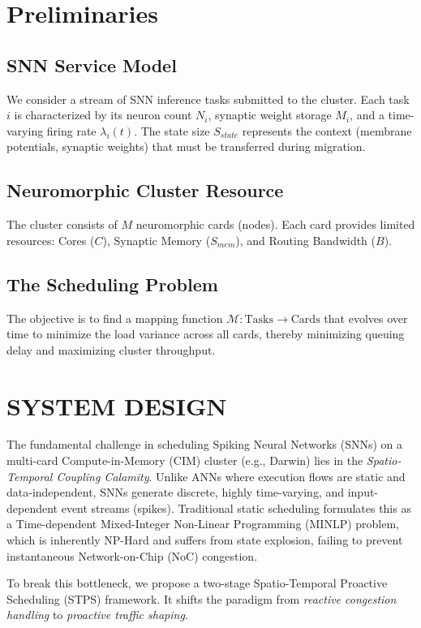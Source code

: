 \documentclass[letterpaper,twocolumn,10pt]{article}
\begin{document}
\section{Preliminaries}
\subsection{SNN Service Model}
We consider a stream of SNN inference tasks submitted to the cluster. Each task $i$ is characterized by its neuron count $N_i$, synaptic weight storage $M_i$, and a time-varying firing rate $\lambda_i(t)$. The state size $S_{state}$ represents the context (membrane potentials, synaptic weights) that must be transferred during migration.

\subsection{Neuromorphic Cluster Resource}
The cluster consists of $M$ neuromorphic cards (nodes). Each card provides limited resources: Cores ($C$), Synaptic Memory ($S_{mem}$), and Routing Bandwidth ($B$).

\subsection{The Scheduling Problem}
The objective is to find a mapping function $\mathcal{M}: \text{Tasks} \to \text{Cards}$ that evolves over time to minimize the load variance across all cards, thereby minimizing queuing delay and maximizing cluster throughput.


\section{SYSTEM DESIGN}
The fundamental challenge in scheduling Spiking Neural Networks (SNNs) on a multi-card Compute-in-Memory (CIM) cluster (e.g., Darwin) lies in the \textit{Spatio-Temporal Coupling Calamity}. Unlike ANNs where execution flows are static and data-independent, SNNs generate discrete, highly time-varying, and input-dependent event streams (spikes). Traditional static scheduling formulates this as a Time-dependent Mixed-Integer Non-Linear Programming (MINLP) problem, which is inherently NP-Hard and suffers from state explosion, failing to prevent instantaneous Network-on-Chip (NoC) congestion. 

To break this bottleneck, we propose a two-stage Spatio-Temporal Proactive Scheduling (STPS) framework. It shifts the paradigm from \textit{reactive congestion handling} to \textit{proactive traffic shaping}. 
\end{document}
